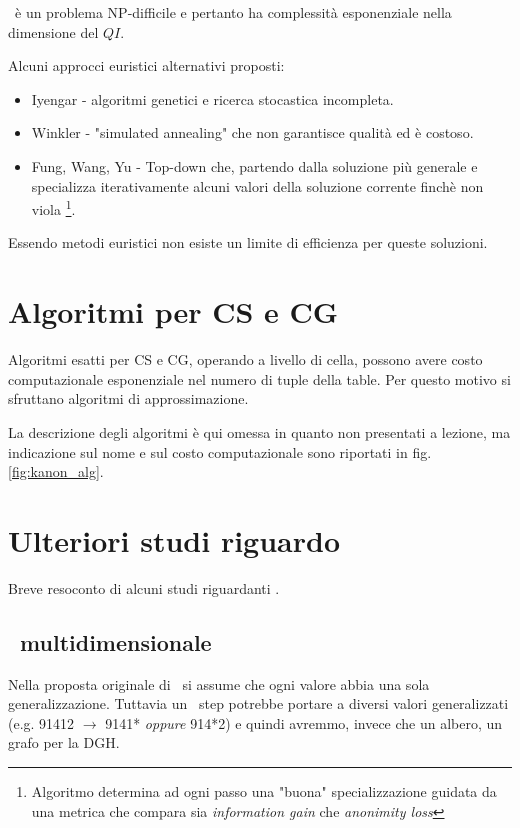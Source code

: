 \kanon\ è un problema NP-difficile e pertanto ha complessità esponenziale nella dimensione del $QI$.

Alcuni approcci euristici alternativi proposti:

\begin{itemize}
    \item Iyengar - algoritmi genetici e ricerca stocastica incompleta.
    \item Winkler - "simulated annealing" che non garantisce qualità ed è costoso.
    \item Fung, Wang, Yu - Top-down che, partendo dalla soluzione più generale e specializza iterativamente alcuni valori della soluzione corrente finchè non viola \kanon \footnote{Algoritmo determina ad ogni passo una "buona" specializzazione guidata da una metrica che compara sia \textit{information gain} che \textit{anonimity loss}}.
\end{itemize}

Essendo metodi euristici non esiste un limite di efficienza per queste soluzioni.




\section{Algoritmi per \textunderscore CS e CG\textunderscore}

Algoritmi esatti per \textunderscore CS e CG\textunderscore, operando a livello di cella, possono avere costo computazionale esponenziale nel numero di tuple della table. Per questo motivo si sfruttano algoritmi di approssimazione.

La descrizione degli algoritmi è qui omessa in quanto non presentati a lezione, ma indicazione sul nome e sul costo computazionale sono riportati in fig.\ref{fig:kanon_alg}.





\section{Ulteriori studi riguardo \kanon}

Breve resoconto di alcuni studi riguardanti \kanon.


\subsection{\kanon\ multidimensionale}

Nella proposta originale di \kanon\ si assume che ogni valore abbia una sola generalizzazione. Tuttavia un \gen\ step potrebbe portare a diversi valori generalizzati (e.g. 91412 $\rightarrow$ 9141* \textit{oppure} 914*2) e quindi avremmo, invece che un albero, un grafo per la DGH.

